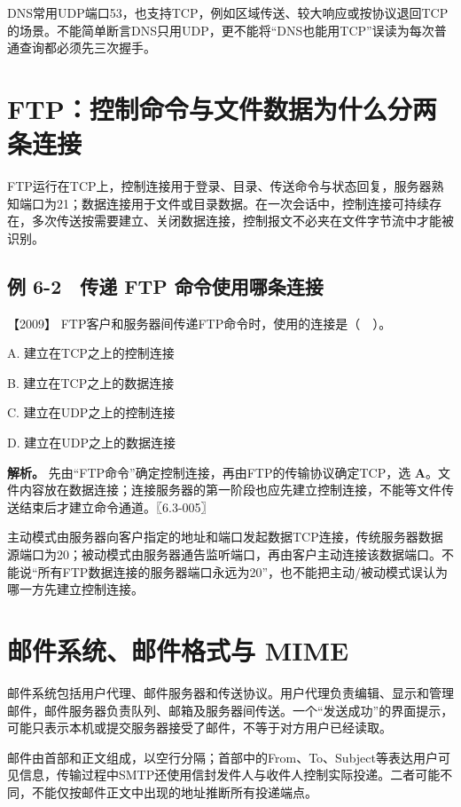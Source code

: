 DNS常用UDP端口53，也支持TCP，例如区域传送、较大响应或按协议退回TCP的场景。不能简单断言DNS只用UDP，更不能将``DNS也能用TCP''误读为每次普通查询都必须先三次握手。

\section{FTP：控制命令与文件数据为什么分两条连接}\label{cn-06-04}

FTP运行在TCP上，控制连接用于登录、目录、传送命令与状态回复，服务器熟知端口为21；数据连接用于文件或目录数据。在一次会话中，控制连接可持续存在，多次传送按需要建立、关闭数据连接，控制报文不必夹在文件字节流中才能被识别。

\subsection{例 6-2　传递 FTP 命令使用哪条连接}\label{cn-ex6-2}

\noindent{}【2009】 FTP客户和服务器间传递FTP命令时，使用的连接是（　）。

A. 建立在TCP之上的控制连接

B. 建立在TCP之上的数据连接

C. 建立在UDP之上的控制连接

D. 建立在UDP之上的数据连接


\textbf{解析。} 先由``FTP命令''确定控制连接，再由FTP的传输协议确定TCP，选 \textbf{A}。文件内容放在数据连接；连接服务器的第一阶段也应先建立控制连接，不能等文件传送结束后才建立命令通道。〖6.3-005〗

主动模式由服务器向客户指定的地址和端口发起数据TCP连接，传统服务器数据源端口为20；被动模式由服务器通告监听端口，再由客户主动连接该数据端口。不能说``所有FTP数据连接的服务器端口永远为20''，也不能把主动/被动模式误认为哪一方先建立控制连接。

\section{邮件系统、邮件格式与 MIME}\label{cn-06-05}

邮件系统包括用户代理、邮件服务器和传送协议。用户代理负责编辑、显示和管理邮件，邮件服务器负责队列、邮箱及服务器间传送。一个``发送成功''的界面提示，可能只表示本机或提交服务器接受了邮件，不等于对方用户已经读取。

邮件由首部和正文组成，以空行分隔；首部中的From、To、Subject等表达用户可见信息，传输过程中SMTP还使用信封发件人与收件人控制实际投递。二者可能不同，不能仅按邮件正文中出现的地址推断所有投递端点。

